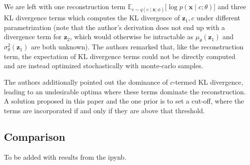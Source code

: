 We are left with one reconstruction term $\mathbb{E}_{c \sim q(c \mid \mathbf{x}; \phi)}\bigl[\log p(\mathbf{x} \mid c; \theta)\bigr]$ and three KL divergence terms which computes the KL divergence of $\mathbf{z}_1,c$ under different parametrization (note that the author's derivation does not end up with a divergence term for $\mathbf{z}_2$, which would otherwise be intractable as $\mu_\theta(\mathbf{z}_1)$ and $\sigma^2_\theta(\mathbf{z}_1)$ are both unknown). The authors remarked that, like the reconstruction term, the expectation of KL divergence terms could not be directly computed and are instead optimized stochastically with monte-carlo samples.

The authors additionally pointed out the dominance of $c$-termed KL divergence, leading to an undesirable optima where these terms dominate the reconstruction. A solution proposed in this paper and the one prior is to set a cut-off, where the terms are incorporated if and only if they are above that threshold.

\subsection{Comparison}

To be added with results from the ipynb.